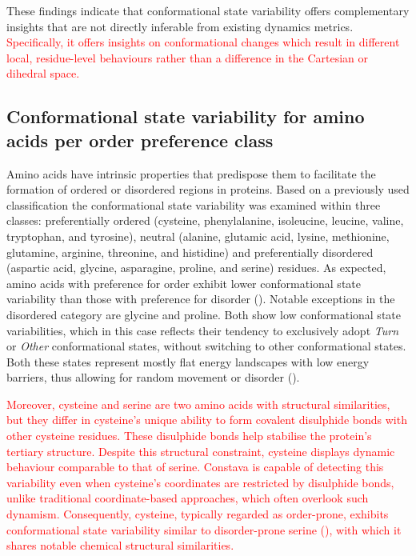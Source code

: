 These findings indicate that conformational state variability offers complementary insights that are not directly inferable from existing dynamics metrics. \textcolor{red}{Specifically, it offers insights on conformational changes which result in different local, residue-level behaviours rather than a difference in the Cartesian or dihedral space.}

\subsection{Conformational state variability for amino acids per order preference class} \label{section:aa_preference}

Amino acids have intrinsic properties that predispose them to facilitate the formation of ordered or disordered regions in proteins. Based on a previously used classification \cite{cilia_protein_2013} the conformational state variability was examined within three classes: preferentially ordered (cysteine, phenylalanine, isoleucine, leucine, valine, tryptophan, and tyrosine), neutral (alanine, glutamic acid, lysine, methionine, glutamine, arginine, threonine, and histidine) and preferentially disordered (aspartic acid, glycine,  asparagine, proline, and serine) residues. As expected, amino acids with preference for order exhibit lower conformational state variability than those with preference for disorder (). Notable exceptions in the disordered category are glycine and proline. Both show low conformational state variabilities, which in this case reflects their tendency to exclusively adopt \textit{Turn} or \textit{Other} conformational states, without switching to other conformational states. Both these states represent mostly flat energy landscapes with low energy barriers, thus allowing for random movement or disorder (). 

\textcolor{red}{Moreover, cysteine and serine are two amino acids with structural similarities, but they differ in cysteine’s unique ability to form covalent disulphide bonds with other cysteine residues. These disulphide bonds help stabilise the protein’s tertiary structure. Despite this structural constraint, cysteine displays dynamic behaviour comparable to that of serine. Constava is capable of detecting this variability even when cysteine’s coordinates are restricted by disulphide bonds, unlike traditional coordinate-based approaches, which often overlook such dynamism. Consequently, cysteine, typically regarded as order-prone, exhibits conformational state variability similar to disorder-prone serine (), with which it shares notable chemical structural similarities.}

